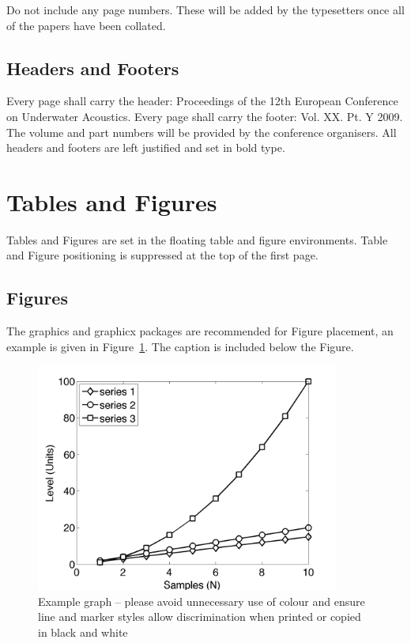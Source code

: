 \documentclass[10pt,a4paper]{article}
\begin{document}
Do not include any page numbers. These will be added by the typesetters once all of the papers have been collated.

\subsection{Headers and Footers}
Every page shall carry the header: Proceedings of the 12th European Conference on Underwater Acoustics. Every page shall carry the footer: Vol. XX. Pt. Y 2009. The volume and part numbers will be provided by the conference organisers.  All headers and footers are left justified and set in bold type.

\section{Tables and Figures}

Tables and Figures are set in the floating table and figure environments. Table and Figure positioning is suppressed at the top of the first page.

\subsection{Figures}

The graphics and graphicx packages are recommended for Figure placement, an example is given in Figure~\ref{fig1:egFig}. The caption is included below the Figure.

\begin{figure}
\begin{center}
\includegraphics[width=10cm]{./egFigure.png}
\caption{\label{fig1:egFig} Example graph -- please avoid unnecessary use of colour and ensure line and marker styles allow discrimination when printed or copied in black and white}
\end{center}
\end{figure}
\end{document}
